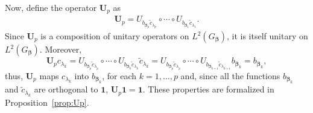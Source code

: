 \documentclass[11pt]{article}
\newcommand{\vect}[1]{\boldsymbol{#1}}
\begin{document}
Now, define the operator $\vect{U}_p$ as 
\begin{equation*}
    \begin{aligned}
\vect{U}_p =U_{b_{\vect{\beta}_p} \widetilde{c}_{\lambda_p}} \circ \cdots  \circ U_{b_{\vect{\beta}_1} \widetilde{c}_{\lambda_1}}.
\label{eqn:Ud}
\end{aligned}
\end{equation*}
Since $\vect{U}_p$ is a composition of unitary operators on $L^2\left(G_{\vect{\beta}}\right)$, it is itself unitary on $L^2\left(G_{\vect{\beta}}\right)$. Moreover, 
\begin{equation*}
    \vect{U}_{p}c_{\lambda_k} = U_{b_{\vect{\beta}_p} \widetilde{c}_{\lambda_p}} \circ \cdots \circ U_{b_{\vect{\beta}_{k}} \widetilde{c}_{\lambda_{k}}} \widetilde{c}_{\lambda_{k}} = U_{b_{\vect{\beta}_p} \widetilde{c}_{\lambda_p}} \circ \cdots \circ U_{b_{\vect{\beta}_{k+1}} \widetilde{c}_{\lambda_{k+1}}} b_{\vect{\beta}_k} = b_{\vect{\beta}_k},
\end{equation*}
thus, $\vect{U}_{p}$ maps $ c_{\lambda_k} $ into $b_{\vect{\beta}_k}$, for each $k=1,\dots,p$ and, since all the functions $b_{\vect{\beta}_k}$ and $\widetilde{c}_{\lambda_k}$
are orthogonal to
$\vect{1}$, $\vect{U}_{p}\vect{1}=\vect{1}$. These properties are formalized in Proposition~\ref{prop:Up}. 
\end{document}
